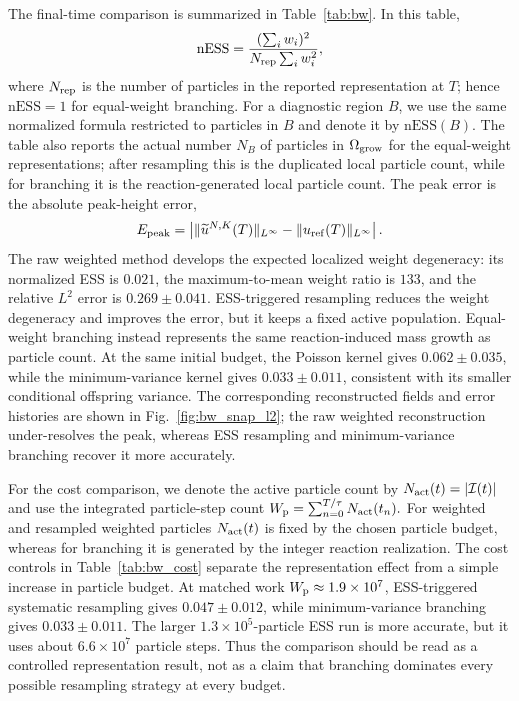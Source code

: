 The final-time comparison is summarized in Table~\ref{tab:bw}.  In this table,
\[
\mathrm{nESS}
=
\frac{(\sum_i w_i)^2}{N_{\rm rep}\sum_i w_i^2},
\]
where \(N_{\rm rep}\) is the number of particles in the reported representation at
\(T\); hence \(\mathrm{nESS}=1\) for equal-weight branching.  For a diagnostic region
\(B\), we use the same normalized formula restricted to particles in \(B\) and denote it
by \(\mathrm{nESS}(B)\).  The table also reports the actual number \(N_B\) of
particles in \(\Omega_{\rm grow}\) for the equal-weight representations; after
resampling this is the duplicated local particle count, while for branching it is the
reaction-generated local particle count.  The peak error is the absolute peak-height
error,
\[
E_{\rm peak}
=
\left|
\|\widetilde u^{N,K}(T)\|_{L^\infty}
-
\|u_{\rm ref}(T)\|_{L^\infty}
\right|.
\]
The raw weighted method develops the expected localized weight degeneracy: its
normalized ESS is \(0.021\), the maximum-to-mean weight ratio is \(133\), and the
relative \(L^2\) error is \(0.269\pm0.041\).  ESS-triggered resampling reduces the
weight degeneracy and improves the error, but it keeps a fixed active population.
Equal-weight branching instead represents the same reaction-induced mass growth as
particle count.  At the same initial budget, the Poisson kernel gives
\(0.062\pm0.035\), while the minimum-variance kernel gives \(0.033\pm0.011\),
consistent with its smaller conditional offspring variance.  The corresponding
reconstructed fields and error histories are shown in Fig.~\ref{fig:bw_snap_l2}; the raw
weighted reconstruction under-resolves the peak, whereas ESS resampling and
minimum-variance branching recover it more accurately.

For the cost comparison, we denote the active particle count by
\(
N_{\rm act}(t)=|\mathcal I(t)|
\)
and use the integrated particle-step count
\(
W_{\rm p}=\sum_{n=0}^{T/\tau}N_{\rm act}(t_n).
\)
For weighted and resampled weighted particles \(N_{\rm act}(t)\) is fixed by the chosen
particle budget, whereas for branching it is generated by the integer reaction
realization.  The cost controls in Table~\ref{tab:bw_cost} separate the representation
effect from a simple increase in particle budget.  At matched work
\(W_{\rm p}\approx1.9\times10^7\), ESS-triggered systematic resampling gives
\(0.047\pm0.012\), while minimum-variance branching gives \(0.033\pm0.011\).  The larger
\(1.3\times10^5\)-particle ESS run is more accurate, but it uses about
\(6.6\times10^7\) particle steps.  Thus the comparison should be read as a controlled
representation result, not as a claim that branching dominates every possible resampling
strategy at every budget.

